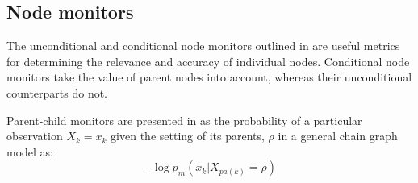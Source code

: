 \documentclass[12pt]{article}
\begin{document}
%
%

%
% 
%


\subsection{Node monitors}

The unconditional and conditional node monitors outlined in \cite{ibid} are useful metrics for determining the relevance and accuracy of individual nodes. Conditional node monitors take the value of parent nodes into account, whereas their unconditional counterparts do not. 


%
Parent-child monitors are presented in \cite{diagnostics} as the probability of a particular observation $X_k = x_k$ given the setting of its parents, $\rho$ in a general chain graph model as:
\begin{equation}
-\log p_m (x_k | X_{pa(k)}=\rho)
\end{equation}
\end{document}
